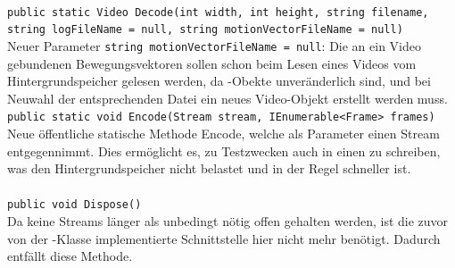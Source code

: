 \paragraph{}
\begin{itemize}
	\add \verb!public static Video Decode(int width, int height, string filename, string logFileName = null, string motionVectorFileName = null)! \\
	Neuer Parameter \verb!string motionVectorFileName = null!: Die an ein Video gebundenen Bewegungsvektoren sollen schon beim Lesen eines Videos vom Hintergrundspeicher gelesen werden, da -Obekte unveränderlich sind, und bei Neuwahl der entsprechenden Datei ein neues Video-Objekt erstellt werden muss.
	\add \verb!public static void Encode(Stream stream, IEnumerable<Frame> frames)! \\
	Neue öffentliche statische Methode Encode, welche als Parameter einen Stream entgegennimmt. Dies ermöglicht es, zu Testzwecken auch in einen  zu schreiben, was den Hintergrundspeicher nicht belastet und in der Regel schneller ist.
\end{itemize}

\paragraph{}
\begin{itemize}
	\remove \verb!public void Dispose()! \\
	Da keine Streams länger als unbedingt nötig offen gehalten werden, ist die zuvor von der -Klasse implementierte Schnittstelle  hier nicht mehr benötigt. Dadurch entfällt diese Methode.
\end{itemize}
\newpage

